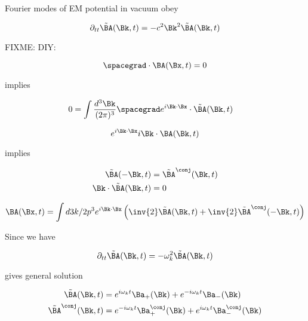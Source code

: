 Fourier modes of EM potential in vacuum obey

\begin{equation}\label{eqn:relativisticElectrodynamicsL15:530}
\partial_{tt} \tilde{\BA}(\Bk, t) = -c^2 \Bk^2 \tilde{\BA}(\Bk, t)
\end{equation}

FIXME: DIY:

\begin{equation}\label{eqn:relativisticElectrodynamicsL15:550}
\spacegrad \cdot \BA(\Bx, t) = 0
\end{equation}

implies

\begin{align*}
0 
&= \int \frac{d^3 \Bk }{(2 \pi)^3} \spacegrad e^{i \Bk \cdot \Bx} \cdot \tilde{\BA}(\Bk, t)
\end{align*}

\begin{equation}\label{eqn:relativisticElectrodynamicsL15:570}
e^{i \Bk \cdot \Bx} i \Bk \cdot \BA(\Bk, t)
\end{equation}

implies

\begin{align}\label{eqn:relativisticElectrodynamicsL15:590}
\tilde{\BA}(-\Bk, t) &= \tilde{\BA}^\conj(\Bk, t) \\
\Bk \cdot \tilde{\BA}(\Bk, t) &= 0
\end{align}

\begin{equation}\label{eqn:relativisticElectrodynamicsL15:610}
\BA(\Bx, t) = \int d3k/2p^3 e^{i \Bk \cdot \Bx} \left( \inv{2} \tilde{\BA}(\Bk, t) + \inv{2} \tilde{\BA}^\conj(- \Bk, t) \right)
\end{equation}

Since we have

\begin{equation}\label{eqn:relativisticElectrodynamicsL15:630}
\partial_{tt} \tilde{\BA}(\Bk, t) = - \omega_k^2 \tilde{\BA}(\Bk, t)
\end{equation}

gives general solution 

\begin{align}\label{eqn:relativisticElectrodynamicsL15:650}
\tilde{\BA}(\Bk, t) &= e^{i \omega_k t} \Ba_{+}(\Bk) +e^{-i \omega_k t} \Ba_{-}(\Bk) \\
\tilde{\BA}^\conj(\Bk, t) &= e^{-i \omega_k t} \Ba_{+}^\conj(\Bk) +e^{i \omega_k t} \Ba_{-}^\conj(\Bk)
\end{align}

